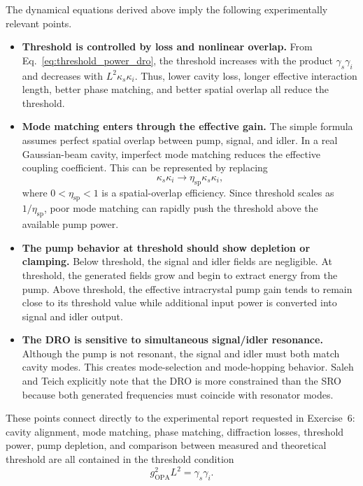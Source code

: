 \begin{resolucao}[Solution]
    The dynamical equations derived above imply the following experimentally relevant points.

    \begin{itemize}
        \item \textbf{Threshold is controlled by loss and nonlinear overlap.}
        From Eq.~\eqref{eq:threshold_power_dro}, the threshold increases with the product $\gamma_s\gamma_i$ and decreases with $L^2\kappa_s\kappa_i$. Thus, lower cavity loss, longer effective interaction length, better phase matching, and better spatial overlap all reduce the threshold.

        \item \textbf{Mode matching enters through the effective gain.}
        The simple formula assumes perfect spatial overlap between pump, signal, and idler. In a real Gaussian-beam cavity, imperfect mode matching reduces the effective coupling coefficient. This can be represented by replacing
        \[
            \kappa_s\kappa_i
            \rightarrow
            \eta_{\mathrm{sp}}\kappa_s\kappa_i,
        \]
        where $0<\eta_{\mathrm{sp}}<1$ is a spatial-overlap efficiency. Since threshold scales as $1/\eta_{\mathrm{sp}}$, poor mode matching can rapidly push the threshold above the available pump power.

        \item \textbf{The pump behavior at threshold should show depletion or clamping.}
        Below threshold, the signal and idler fields are negligible. At threshold, the generated fields grow and begin to extract energy from the pump. Above threshold, the effective intracrystal pump gain tends to remain close to its threshold value while additional input power is converted into signal and idler output.

        \item \textbf{The DRO is sensitive to simultaneous signal/idler resonance.}
        Although the pump is not resonant, the signal and idler must both match cavity modes. This creates mode-selection and mode-hopping behavior. Saleh and Teich explicitly note that the DRO is more constrained than the SRO because both generated frequencies must coincide with resonator modes.
    \end{itemize}

    These points connect directly to the experimental report requested in Exercise~6: cavity alignment, mode matching, phase matching, diffraction losses, threshold power, pump depletion, and comparison between measured and theoretical threshold are all contained in the threshold condition
    \[
        g_{\mathrm{OPA}}^2L^2=\gamma_s\gamma_i.
    \]

\end{resolucao}
